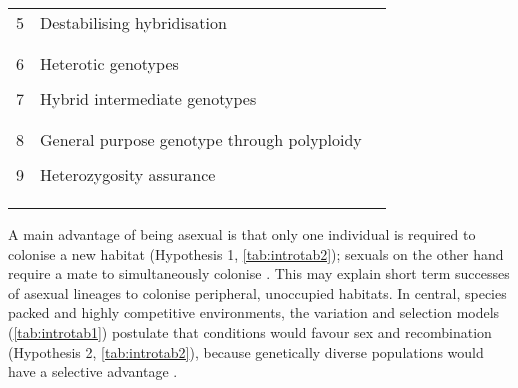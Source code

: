 \begin{table}[h]
{\begin{tabular}{@{}llr@{}}
5         & Destabilising hybridisation                     & \cite{lynch_destabilizing_1984}                   \\
          &                                                 & \cite{paulissen_ecology_1988}         \\
          &                                                 & \multicolumn{1}{l}{}         \\
6         & Heterotic genotypes                             & \cite{white_heterozygosity_1970}                   \\
          &                                                 & \multicolumn{1}{l}{}         \\
7         & Hybrid intermediate genotypes                   & \cite{wright_weeds_1968}                   \\
          &                                                 & \cite{moore_evaluation_1977}         \\
          &                                                 & \multicolumn{1}{l}{}         \\
8         & General purpose genotype through polyploidy     & \cite{vandel_parthenogen`ese_1928}                   \\
          &                                                 & \multicolumn{1}{l}{}         \\
9         & Heterozygosity assurance                        & \cite{vrijenhoek_heterozygosity_1982}    \\
          &                                                 & \cite{beukeboom_evolutionary_1998} \\
          &                                                 & \cite{haag_new_2004}           \\
          &                                                 &                              \\ \bottomrule
\end{tabular}
}
\end{table}

A main advantage of being asexual is that only one individual is required to colonise a new habitat (Hypothesis 1, \cref{tab:introtab2}); sexuals on the other hand require a mate to simultaneously colonise \parencite{baker_characteristics_1965,tomlinson_advantages_1966}. This may explain short term successes of asexual lineages to colonise peripheral, unoccupied habitats. In central, species packed and highly competitive environments, the variation and selection models (\cref{tab:introtab1}) postulate that conditions would favour sex and recombination (Hypothesis 2, \cref{tab:introtab2}), because genetically diverse populations would have a selective advantage \parencite{glesener_sexuality_1978,hamilton_fluctuation_1981}.

